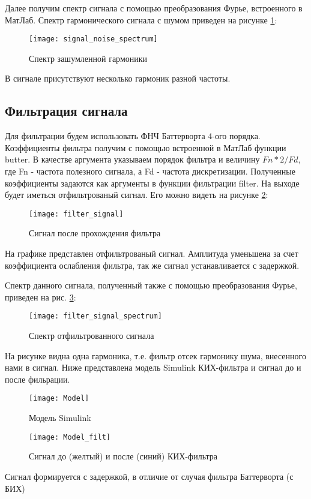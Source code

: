 Далее получим спектр сигнала с помощью преобразования Фурье, встроенного в МатЛаб. Спектр гармонического сигнала с шумом приведен на рисунке \ref{pic:signal_noise_spectrum}:
\begin{figure}[H]
	\begin{center}
		\texttt{[image: signal\_noise\_spectrum]}
		\caption{Спектр зашумленной гармоники} 
		\label{pic:signal_noise_spectrum} %
	\end{center}
\end{figure}
В сигнале присутствуют несколько гармоник разной частоты.

\subsection{Фильтрация сигнала}
Для фильтрации будем использовать ФНЧ Баттерворта 4-ого порядка. Коэффициенты фильтра получим с помощью встроенной в МатЛаб функции butter. В качестве аргумента указываем порядок фильтра и величину $Fn*2/Fd$, где Fn - частота полезного сигнала, а Fd - частота дискретизации.
Полученные коэффициенты задаются как аргументы в функции фильтрации filter. На выходе будет иметься отфильтрованый сигнал. Его можно видеть на рисунке \ref{pic:filter_signal}:
\begin{figure}[H]
	\begin{center}
		\texttt{[image: filter\_signal]}
		\caption{Сигнал после прохождения фильтра} 
		\label{pic:filter_signal} %
	\end{center}
\end{figure}
На графике представлен отфильтрованый сигнал. Амплитуда уменьшена за счет коэффициента ослабления фильтра, так же сигнал устанавливается с задержкой.

Спектр данного сигнала, полученный также с помощью преобразования Фурье, приведен на рис. \ref{pic:filter_signal_spectrum}:
\begin{figure}[H]
	\begin{center}
		\texttt{[image: filter\_signal\_spectrum]}
		\caption{Спектр отфильтрованного сигнала} 
		\label{pic:filter_signal_spectrum} %
	\end{center}
\end{figure}
На рисунке видна одна гармоника, т.е. фильтр отсек гармонику шума, внесенного нами в сигнал.
Ниже представлена модель Simulink КИХ-фильтра и сигнал до и после фильрации.
\begin{figure}[H]
	\begin{center}
		\texttt{[image: Model]}
		\caption{Модель Simulink} 
		\label{pic:Model} %
	\end{center}
\end{figure}
\begin{figure}[H]
	\begin{center}
		\texttt{[image: Model\_filt]}
		\caption{Сигнал до (желтый) и после (синий) КИХ-фильтра} 
		\label{pic:Model_filt} %
	\end{center}
\end{figure}
Сигнал формируется с задержкой, в отличие от случая фильтра Баттерворта (с БИХ)

